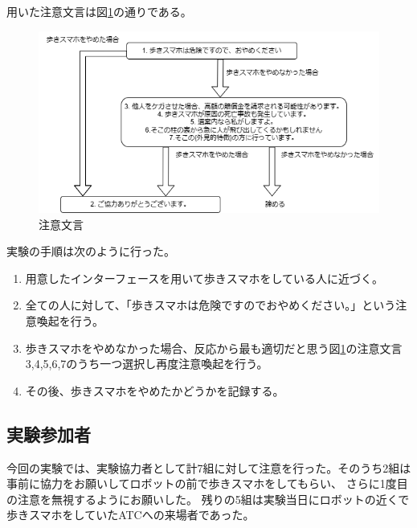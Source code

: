 \documentclass{kuisthesis}
\begin{document}
用いた注意文言は図\ref{fig: Strategy}の通りである。
\begin{figure}[h]
  \includegraphics[width=15cm]{img/waystostop.drawio.png}
  \caption{注意文言}
  \label{fig: Strategy}
\end{figure}
実験の手順は次のように行った。
\begin{enumerate}
  \item 用意したインターフェースを用いて歩きスマホをしている人に近づく。
  \item 全ての人に対して、「歩きスマホは危険ですのでおやめください。」という注意喚起を行う。
  \item 歩きスマホをやめなかった場合、反応から最も適切だと思う図\ref{fig: Strategy}の注意文言3,4,5,6,7のうち一つ選択し再度注意喚起を行う。
  \item その後、歩きスマホをやめたかどうかを記録する。
\end{enumerate}


\subsection{実験参加者}
今回の実験では、実験協力者として計7組に対して注意を行った。そのうち2組は事前に協力をお願いしてロボットの前で歩きスマホをしてもらい、
さらに1度目の注意を無視するようにお願いした。
残りの5組は実験当日にロボットの近くで歩きスマホをしていたATCへの来場者であった。
\end{document}
